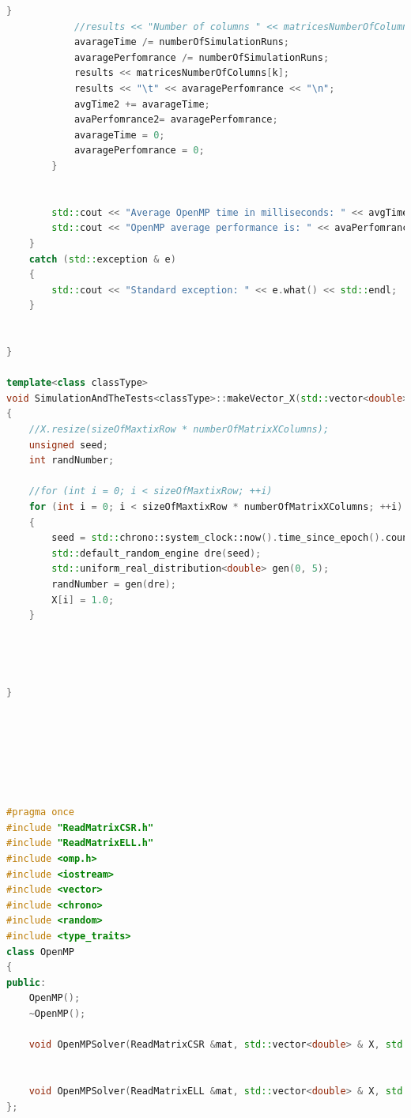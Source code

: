 \documentclass{scrreprt}
\begin{document}
\begin{lstlisting}[language=C++, caption=main.cu]
			}
			//results << "Number of columns " << matricesNumberOfColumns[k] << "\n";
			avarageTime /= numberOfSimulationRuns;
			avaragePerfomrance /= numberOfSimulationRuns;
			results << matricesNumberOfColumns[k];
			results << "\t" << avaragePerfomrance << "\n";
			avgTime2 += avarageTime;
			avaPerfomrance2= avaragePerfomrance;
			avarageTime = 0;
			avaragePerfomrance = 0;
		}


		std::cout << "Average OpenMP time in milliseconds: " << avgTime2 / matricesNumberOfColumns.size() << " ms\n";
		std::cout << "OpenMP average performance is: " << avaPerfomrance2 / matricesNumberOfColumns.size() << " MFLOPS\n" << std::endl;
	}
	catch (std::exception & e)
	{
		std::cout << "Standard exception: " << e.what() << std::endl;
	}


}

template<class classType>
void SimulationAndTheTests<classType>::makeVector_X(std::vector<double>& X, int sizeOfMaxtixRow, int numberOfMatrixXColumns)
{
	//X.resize(sizeOfMaxtixRow * numberOfMatrixXColumns);
	unsigned seed;
	int randNumber;
	
	//for (int i = 0; i < sizeOfMaxtixRow; ++i)
	for (int i = 0; i < sizeOfMaxtixRow * numberOfMatrixXColumns; ++i)
	{
		seed = std::chrono::system_clock::now().time_since_epoch().count();
		std::default_random_engine dre(seed);
		std::uniform_real_distribution<double> gen(0, 5);
		randNumber = gen(dre);
		X[i] = 1.0;
	}

	


}






\end{lstlisting}




\begin{lstlisting}[language=C++, caption=OpenMP.h]


#pragma once
#include "ReadMatrixCSR.h"
#include "ReadMatrixELL.h"
#include <omp.h>
#include <iostream>
#include <vector>
#include <chrono>
#include <random>
#include <type_traits>
class OpenMP
{
public:
	OpenMP();
	~OpenMP();

	void OpenMPSolver(ReadMatrixCSR &mat, std::vector<double> & X, std::vector<double> & Y, int threadsNumber, double & timeToComplete, unsigned int numberOfMatrixXColumn);


	void OpenMPSolver(ReadMatrixELL &mat, std::vector<double> & X, std::vector<double> & Y, int threadsNumber, double & timeToComplete, unsigned int numberOfMatrixXColumn);
};



\end{lstlisting}
\end{document}
